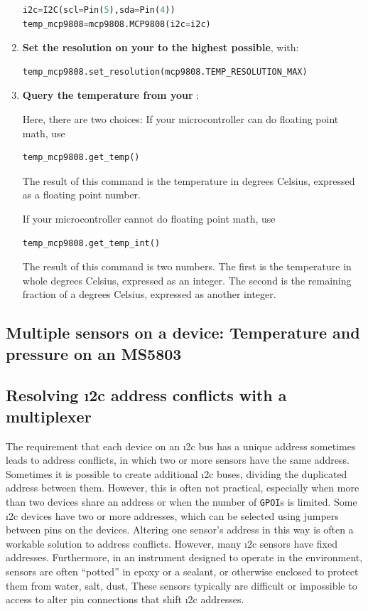 \begin{enumerate}
\begin{lstlisting}[language=Python]
i2c=I2C(scl=Pin(5),sda=Pin(4))
temp_mcp9808=mcp9808.MCP9808(i2c=i2c)
\end{lstlisting}
	\item \textbf{Set the resolution on your  to the highest possible}, with:
\begin{lstlisting}[language=Python]
temp_mcp9808.set_resolution(mcp9808.TEMP_RESOLUTION_MAX)
\end{lstlisting}

	\item \textbf{Query the temperature from your }:

	Here, there are two choices:
	If your microcontroller can do floating point math, use
\begin{lstlisting}[language=Python]
temp_mcp9808.get_temp()
\end{lstlisting}
The result of this command is the temperature in degrees Celsius, expressed as a floating point number.

\smallskip
If your microcontroller cannot do floating point math, use
\begin{lstlisting}[language=Python]
temp_mcp9808.get_temp_int()
\end{lstlisting}
The result of this command is two numbers.
The first is the temperature in whole degrees Celsius, expressed as an integer.
The second is the remaining fraction of a degrees Celsius, expressed as another integer.

\end{enumerate}


\subsection{\color{gray} Multiple sensors on a device: Temperature and pressure on an MS5803 \color{black}}

\subsection{Resolving \i2c address conflicts with a multiplexer}
The requirement that each device on an \i2c bus has a unique address sometimes leads to address conflicts, in which two or more sensors have the same address.
Sometimes it is possible to create additional \i2c buses, dividing the duplicated address between them.
However, this is often not practical, especially when more than two devices share an address or when the number of \texttt{GPOI}s is limited.
Some \i2c devices have two or more addresses, which can be selected using jumpers between pins on the devices.
Altering one sensor's address in this way is often a workable solution to address conflicts.
However, many \i2c sensors have fixed addresses.
Furthermore, in an instrument designed to operate in the environment, sensors are often ``potted'' in epoxy or a sealant, or otherwise enclosed to protect them from water, salt, dust, \etc
These sensors typically are difficult or impossible to access to alter pin connections that shift \i2c addresses.

